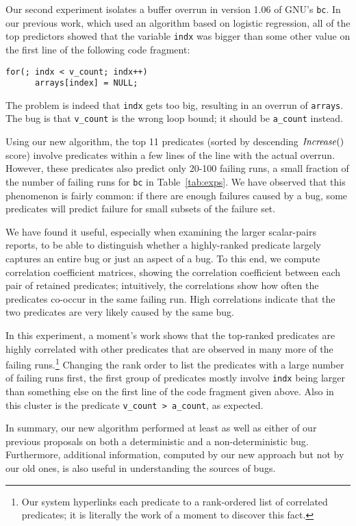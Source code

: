 Our second experiment isolates a buffer overrun in version 1.06 of GNU's {\tt bc}.  In our
previous work, which used an algorithm based on logistic regression, all of the top
predictors showed that the variable {\tt indx} was bigger than some other value on the first line of the following
code fragment:
\begin{verbatim}
for(; indx < v_count; indx++)
      arrays[index] = NULL;
\end{verbatim}
The problem is indeed that {\tt indx} gets too big, resulting in an overrun of {\tt arrays}.  The bug
is that {\tt v\_count} is the wrong loop bound; it should be {\tt a\_count} instead.  

Using our new algorithm, the top 11 predicates (sorted by descending
$\mbox{\textit{Increase}}()$ score) involve predicates within a few lines of the line
with the actual overrun.  However, these predicates also predict only
20-100 failing runs, a small fraction of the number of failing runs
for {\tt bc} in Table~\ref{tab:exps}.  We have observed that this
phenomenon is fairly common: if there are enough failures caused by a
bug, some predicates will predict failure for small subsets of the failure set.

We have found it useful, especially when examining the larger
scalar-pairs reports, to be able to distinguish whether a
highly-ranked predicate largely captures an entire bug or just an aspect of a bug.  To
this end, we compute correlation coefficient matrices, showing the correlation coefficient between each pair of retained predicates; 
intuitively, the
correlations show how often the predicates co-occur in the same failing run.  High correlations
indicate that the two predicates are very likely caused by the same bug.

In this experiment, a moment's work shows that the top-ranked predicates are highly
correlated with other predicates that are observed in many more of the
failing runs.\footnote{Our system hyperlinks each predicate to a
rank-ordered list of correlated predicates; it is literally the work
of a moment to discover this fact.}  Changing the rank order to list
the predicates with a large number of failing runs first, the first
group of predicates mostly involve {\tt indx} being larger than
something else on the first line of the code fragment given above.
Also in this cluster is the predicate {\tt v\_count > a\_count}, as
expected.

In summary, our new algorithm performed at least as well as either of
our previous proposals on both a deterministic and a non-deterministic
bug.     Furthermore, additional information, computed by our new
approach but not by our old ones, is also useful in understanding the
sources of bugs.







